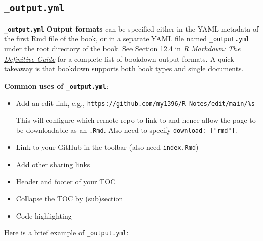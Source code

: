 \documentclass[
  a4paper,
  twoside,
  openright]{book}
\theoremstyle{definition}
\theoremstyle{definition}
\theoremstyle{definition}
\theoremstyle{definition}
\theoremstyle{remark}
\begin{document}
\subsection*{\texorpdfstring{\texttt{\_output.yml}}{\_output.yml}}\label{output.yml}

\textbf{\texttt{\_output.yml}} \textbf{Output formats} can be specified either in the YAML metadata of the first Rmd file of the book, or in a separate YAML file named \texttt{\_output.yml} under the root directory of the book. See \href{https://bookdown.org/yihui/rmarkdown/bookdown-output.html\#bookdown-output}{Section 12.4 in \emph{R Markdown: The Definitive Guide}} for a complete list of bookdown output formats. A quick takeaway is that bookdown supports both book types and single documents.

\textbf{Common uses of \texttt{\_output.yml}}:

\begin{itemize}
\item
  Add an edit link, e.g., \texttt{https://github.com/my1396/R-Notes/edit/main/\%s}

  This will configure which remote repo to link to and hence allow the page to be downloadable as an \texttt{.Rmd}. Also need to specify \texttt{download:\ {[}"rmd"{]}}.
\item
  Link to your GitHub in the toolbar (also need \texttt{index.Rmd})
\item
  Add other sharing links
\item
  Header and footer of your TOC
\item
  Collapse the TOC by (sub)section
\item
  Code highlighting
\end{itemize}

Here is a brief example of \texttt{\_output.yml}:
\end{document}
